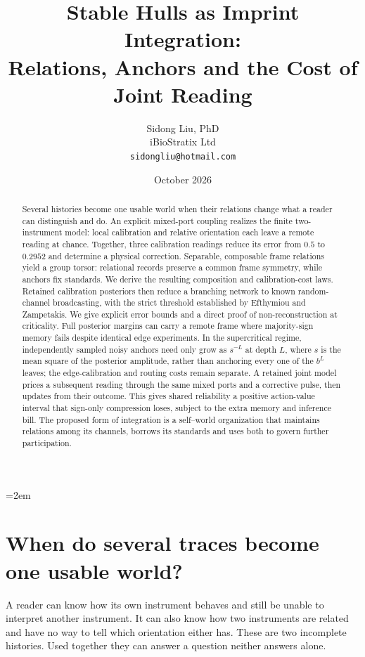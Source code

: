 \documentclass[11pt,a4paper]{article}
\title{Stable Hulls as Imprint Integration:\\Relations, Anchors and the Cost of Joint Reading}
\author{Sidong Liu, PhD\\iBioStratix Ltd\\\texttt{sidongliu@hotmail.com}}
\date{October 2026}
\begin{document}
\emergencystretch=2em
\maketitle

\begin{abstract}
Several histories become one usable world when their relations change what a reader can distinguish and do. An explicit mixed-port coupling realizes the finite two-instrument model: local calibration and relative orientation each leave a remote reading at chance. Together, three calibration readings reduce its error from $0.5$ to $0.2952$ and determine a physical correction. Separable, composable frame relations yield a group torsor: relational records preserve a common frame symmetry, while anchors fix standards. We derive the resulting composition and calibration-cost laws. Retained calibration posteriors then reduce a branching network to known random-channel broadcasting, with the strict threshold established by Efthymiou and Zampetakis. We give explicit error bounds and a direct proof of non-reconstruction at criticality. Full posterior margins can carry a remote frame where majority-sign memory fails despite identical edge experiments. In the supercritical regime, independently sampled noisy anchors need only grow as $s^{-L}$ at depth $L$, where $s$ is the mean square of the posterior amplitude, rather than anchoring every one of the $b^L$ leaves; the edge-calibration and routing costs remain separate. A retained joint model prices a subsequent reading through the same mixed ports and a corrective pulse, then updates from their outcome. This gives shared reliability a positive action-value interval that sign-only compression loses, subject to the extra memory and inference bill. The proposed form of integration is a self--world organization that maintains relations among its channels, borrows its standards and uses both to govern further participation.
\end{abstract}

\section{When do several traces become one usable world?}

A reader can know how its own instrument behaves and still be unable to interpret another instrument. It can also know how two instruments are related and have no way to tell which orientation either has. These are two incomplete histories. Used together they can answer a question neither answers alone.
\end{document}
